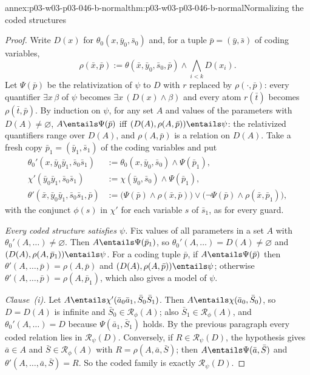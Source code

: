 \begin{annexitem}{annex:p03-w03-p03-046-b-normal}{thm:p03-w03-p03-046-b-normal}{Normalizing the coded structures}
\begin{proof}
Write \(D(x)\) for \(\theta_0(x,\bar y_0,\bar s_0)\) and, for a tuple
\(\bar p=(\bar y,\bar s)\) of coding variables,
\[
\rho(\bar x,\bar p):=\theta(\bar x,\bar y_0,\bar s_0,\bar p)\wedge
\textstyle\bigwedge_{i<k}D(x_i).
\]
Let \(\Psi(\bar p)\) be the relativization of \(\psi\) to \(D\) with \(r\)
replaced by \(\rho(\cdot,\bar p)\): every quantifier \(\exists x\,\beta\) of
\(\psi\) becomes \(\exists x\,(D(x)\wedge\beta)\) and every atom
\(r(\bar t)\) becomes \(\rho(\bar t,\bar p)\). By induction on \(\psi\), for
any set \(A\) and values of the parameters with \(D(A)\neq\varnothing\),
\(A\entails\Psi(\bar p)\) iff \((D(A),\rho(A,\bar p))\entails\psi\): the
relativized quantifiers range over \(D(A)\), and \(\rho(A,\bar p)\) is a
relation on \(D(A)\). Take a fresh copy \(\bar p_1=(\bar y_1,\bar s_1)\) of
the coding variables and put
\begin{align*}
\theta_0'(x,\bar y_0\bar y_1,\bar s_0\bar s_1)&:=\theta_0(x,\bar y_0,\bar
s_0)\wedge\Psi(\bar p_1),\\
\chi'(\bar y_0\bar y_1,\bar s_0\bar s_1)&:=\chi(\bar y_0,\bar
s_0)\wedge\Psi(\bar p_1),\\
\theta'(\bar x,\bar y_0\bar y_1,\bar s_0\bar s_1,\bar p)&:=
\bigl(\Psi(\bar p)\wedge\rho(\bar x,\bar p)\bigr)\vee
\bigl(\neg\Psi(\bar p)\wedge\rho(\bar x,\bar p_1)\bigr),
\end{align*}
with the conjunct \(\phi(s)\) in \(\chi'\) for each variable \(s\) of
\(\bar s_1\), as for every guard.

\emph{Every coded structure satisfies \(\psi\).} Fix values of all
parameters in a set \(A\) with \(\theta_0'(A,\dots)\neq\varnothing\). Then
\(A\entails\Psi(\bar p_1)\), so \(\theta_0'(A,\dots)=D(A)\neq\varnothing\)
and \((D(A),\rho(A,\bar p_1))\entails\psi\). For a coding tuple \(\bar p\),
if \(A\entails\Psi(\bar p)\) then \(\theta'(A,\dots,\bar p)=\rho(A,\bar p)\)
and \((D(A),\rho(A,\bar p))\entails\psi\); otherwise
\(\theta'(A,\dots,\bar p)=\rho(A,\bar p_1)\), which also gives a model of
\(\psi\).

\emph{Clause~(i).} Let \(A\entails\chi'(\bar a_0\bar a_1,\bar S_0\bar
S_1)\). Then \(A\entails\chi(\bar a_0,\bar S_0)\), so \(D=D(A)\) is infinite
and \(\bar S_0\in\mathscr R_\phi(A)\); also \(\bar S_1\in\mathscr
R_\phi(A)\), and \(\theta_0'(A,\dots)=D\) because \(\Psi(\bar a_1,\bar S_1)\)
holds. By the previous paragraph every coded relation lies in
\(\mathscr R_\psi(D)\). Conversely, if \(R\in\mathscr R_\psi(D)\), the
hypothesis gives \(\bar a\in A\) and \(\bar S\in\mathscr R_\phi(A)\) with
\(R=\rho(A,\bar a,\bar S)\); then \(A\entails\Psi(\bar a,\bar S)\) and
\(\theta'(A,\dots,\bar a,\bar S)=R\). So the coded family is exactly
\(\mathscr R_\psi(D)\).


\end{proof}
\end{annexitem}
